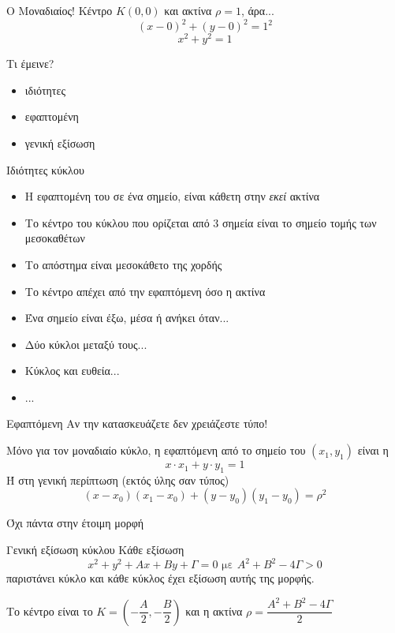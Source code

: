 \documentclass[greek]{beamer}
\begin{document}
\begin{frame}{Ο Μοναδιαίος!}
 Κέντρο $Κ(0,0)$ και ακτίνα $ρ=1$, άρα...
 $$(x-0)^2+(y-0)^2=1^2$$
 $$x^2+y^2=1$$
\end{frame}

\begin{frame}{Τι έμεινε?}
 \begin{itemize}
  \item ιδιότητες
  \item εφαπτομένη
  \item γενική εξίσωση
 \end{itemize}
\end{frame}

\begin{frame}{Ιδιότητες κύκλου}
 \begin{itemize}
  \item<1-> Η εφαπτομένη του σε ένα σημείο, είναι κάθετη στην \emph{εκεί} ακτίνα
  \item<2-> Το κέντρο του κύκλου που ορίζεται από $3$ σημεία είναι το σημείο τομής των μεσοκαθέτων
  \item<3-> Το απόστημα είναι μεσοκάθετο της χορδής
  \item<4-> Το κέντρο απέχει από την εφαπτόμενη όσο η ακτίνα
  \item<5-> Ένα σημείο είναι έξω, μέσα ή ανήκει όταν...
  \item<6-> Δύο κύκλοι μεταξύ τους...
  \item<7-> Κύκλος και ευθεία...
  \item<8-> ...
 \end{itemize}

\end{frame}

\begin{frame}[label=Εφαπτόμενη]{Εφαπτόμενη}
 Αν την κατασκευάζετε δεν χρειάζεστε τύπο!

 Μόνο για τον μοναδιαίο κύκλο, η εφαπτόμενη από το σημείο του $(x_1,y_1)$ είναι η
 $$x\cdot x_1+y\cdot y_1=1$$
 Ή στη γενική περίπτωση (εκτός ύλης σαν τύπος)
 $$(x-x_0)(x_1-x_0)+(y-y_0)(y_1-y_0)=ρ^2$$

 \hyperlink{Απόδειξη}{}
\end{frame}

\begin{frame}[label=ΓενικήΕξίσωση]{Όχι πάντα στην έτοιμη μορφή}

 \begin{block}{Γενική εξίσωση κύκλου}
  Κάθε εξίσωση
  $$x^2+y^2+Αx+Βy+Γ=0\text{ με }Α^2+Β^2-4Γ>0$$
  παριστάνει κύκλο και κάθε κύκλος έχει εξίσωση αυτής της μορφής.

  Το κέντρο είναι το $Κ=(-\dfrac{Α}{2},-\dfrac{Β}{2})$ και η ακτίνα $ρ=\dfrac{Α^2+Β^2-4Γ}{2}$
 \end{block}

 \hyperlink{Απόδειξη2}{}

 \hyperlink{Απόδειξη3}{}
\end{frame}
\end{document}
